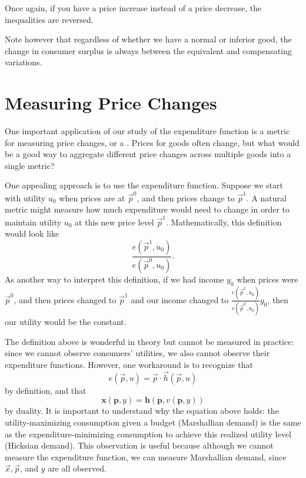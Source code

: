 Once again, if you have a price increase instead of a price decrease, the inequalities are reversed. 

Note however that regardless of whether we have a normal or inferior good, the change in consumer surplus is always between the equivalent and compensating variations. 

\section{Measuring Price Changes}

One important application of our study of the expenditure function is a metric for measuring price changes, or a . Prices for goods often change, but what would be a good way to aggregate different price changes across multiple goods into a single metric?

One appealing approach is to use the expenditure function. Suppose we start with utility $u_0$ when prices are at $\vec{p}^0$, and then prices change to $\vec{p}^1$. A natural metric might measure how much expenditure would need to change in order to maintain utility $u_0$ at this new price level $\vec{p}^1$. Mathematically, this definition would look like
$$\frac{e(\vec{p}^1, u_0)}{e(\vec{p}^0, u_0)}.$$
As another way to interpret this definition, if we had income $y_0$ when prices were $\vec{p}^0$, and then prices changed to $\vec{p}^1$ and our income changed to $\frac{e(\vec{p}^1, u_0)}{e(\vec{p}^0, u_0)}y_0$, then our utility would be the constant.

The definition above is wonderful in theory but cannot be measured in practice: since we cannot observe consumers' utilities, we also cannot observe their expenditure functions. However, one workaround is to recognize that 
$$e(\vec{p}, u) = \vec{p}\cdot \vec{h} (\vec{p}, u)$$
by definition, and that
$$\mathbf{x}(\mathbf{p}, y)=\mathbf{h}(\mathbf{p}, v(\mathbf{p}, y))$$
by duality. It is important to understand why the equation above holds: the utility-maximizing consumption given a budget (Marshallian demand) is the same as the expenditure-minimizing consumption to achieve this realized utility level (Hicksian demand). This observation is useful because although we cannot measure the expenditure function, we can measure Marshallian demand, since $\vec{x}, \vec{p}$, and $y$ are all observed.

